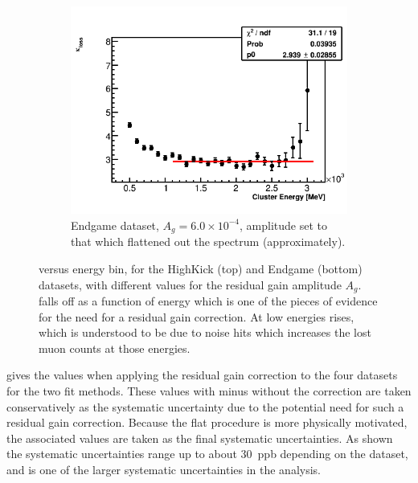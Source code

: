\begin{landscape}
\begin{figure}[h]
    \hspace{1cm}
    \begin{subfigure}[t]{0.34\textwidth}
        \centering
        \includegraphics[width=\textwidth]{TMethod_kappa_loss_Vs_EBin_Canv_EG-6p0}
        \caption{Endgame dataset, $A_{g} = 6.0 \times 10^{-4}$, amplitude set to that which flattened out the \K spectrum (approximately).}
    \end{subfigure}
\caption[]{\K versus energy bin, for the HighKick (top) and Endgame (bottom) datasets, with different values for the residual gain amplitude $A_{g}$. \K falls off as a function of energy which is one of the pieces of evidence for the need for a residual gain correction. At low energies \K rises, which is understood to be due to noise hits which increases the lost muon counts at those energies.}
\label{fig:EBinKloss}
\end{figure}
\end{landscape}







 gives the \DR values when applying the residual gain correction to the four datasets for the two fit methods. These \DR values with minus without the correction are taken conservatively as the systematic uncertainty due to the potential need for such a residual gain correction. Because the flat \K procedure is more physically motivated, the associated values are taken as the final systematic uncertainties. As shown the systematic uncertainties range up to about 30~ppb depending on the dataset, and is one of the larger systematic uncertainties in the analysis.


